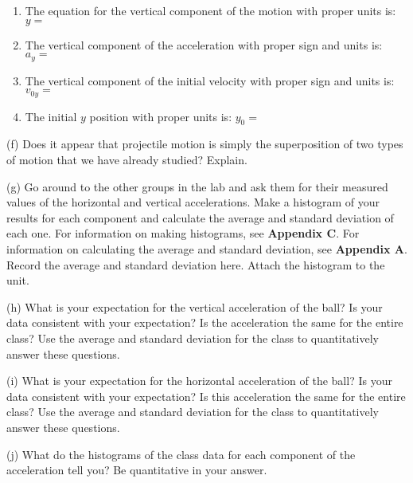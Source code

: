 \begin{enumerate}
\item The equation for the vertical component of the motion with proper units is:
$y =$\vspace{5mm}

\item The vertical component of the acceleration with proper sign and units is: 
\( a_{y}= \)
\vspace{5mm}

\item The vertical component of the initial velocity with proper sign and units is:
\( v_{0y}= \) \vspace{5mm}

\item The initial $y$ position with proper units is: \( y_{0} =\) \vspace{5mm}

\end{enumerate}
(f) Does it appear that projectile motion is simply the superposition of two
types of motion that we have already studied? Explain.
\vspace{20mm}

(g) Go around to the other groups in the lab and ask them for their measured values of the horizontal and vertical accelerations.
Make a histogram of your results for each component and calculate the average and standard deviation of each one.
For information on making histograms, see \textbf{Appendix C}. For information on calculating the average and
standard deviation, see \textbf{Appendix A}. Record the average and standard deviation here.
Attach the histogram to the unit.
\vspace{20mm}

(h) What is your expectation for the vertical acceleration of the ball? Is your data consistent with your expectation?
Is the acceleration the same for the entire class? 
Use the average and standard deviation for the class to quantitatively answer these questions.
\vspace{20mm}

(i) What is your expectation for the horizontal acceleration of the ball?  Is your data consistent with your expectation?
Is this acceleration the same for the entire class? 
Use the average and standard deviation for the class to quantitatively answer these questions.
\vspace{20mm}

(j) What do the histograms of the class data for each component of the acceleration tell you? Be quantitative in your answer.
\vspace{20mm}

